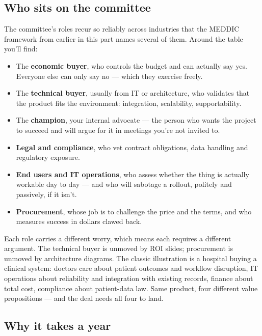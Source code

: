 \subsection{Who sits on the committee}


The committee's roles recur so reliably across industries that the MEDDIC framework from earlier in this part names several of them. Around the table you'll find:


\begin{itemize}[leftmargin=*]
\item The \textbf{economic buyer}, who controls the budget and can actually say yes. Everyone else can only say no — which they exercise freely.
\item The \textbf{technical buyer}, usually from IT or architecture, who validates that the product fits the environment: integration, scalability, supportability.
\item The \textbf{champion}, your internal advocate — the person who wants the project to succeed and will argue for it in meetings you're not invited to.
\item \textbf{Legal and compliance}, who vet contract obligations, data handling and regulatory exposure.
\item \textbf{End users and IT operations}, who assess whether the thing is actually workable day to day — and who will sabotage a rollout, politely and passively, if it isn't.
\item \textbf{Procurement}, whose job is to challenge the price and the terms, and who measures success in dollars clawed back.
\end{itemize}

Each role carries a different worry, which means each requires a different argument. The technical buyer is unmoved by ROI slides; procurement is unmoved by architecture diagrams. The classic illustration is a hospital buying a clinical system: doctors care about patient outcomes and workflow disruption, IT operations about reliability and integration with existing records, finance about total cost, compliance about patient-data law. Same product, four different value propositions — and the deal needs all four to land.



\subsection{Why it takes a year}


